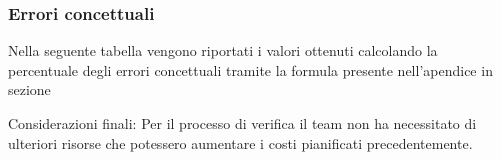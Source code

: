 \subsubsection{Errori concettuali}

Nella seguente tabella vengono riportati i valori ottenuti calcolando la percentuale degli errori concettuali tramite la formula presente nell'apendice in sezione ~


Considerazioni finali: Per il processo di verifica il team non ha necessitato di ulteriori risorse che potessero aumentare i costi pianificati precedentemente.

